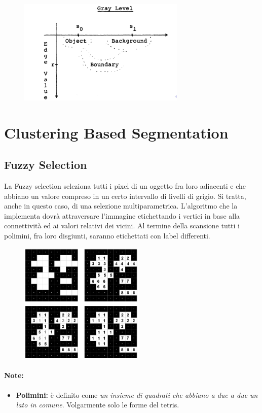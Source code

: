 \begin{figure}[H]
    \centering
    \includegraphics[width=8cm, keepaspectratio]{capitoli/immagini/imgs/edgepanda.png}
\end{figure}

\section{Clustering Based Segmentation}
\subsection{Fuzzy Selection}

La Fuzzy selection seleziona tutti i pixel di un oggetto fra loro adiacenti e che abbiano un valore compreso in un certo intervallo di livelli di grigio.
Si tratta, anche in questo caso, di una selezione multiparametrica. L'algoritmo che la implementa dovrà attraversare l'immagine etichettando i vertici in base alla connettività ed ai valori relativi dei vicini.
Al termine della scansione tutti i polimini, fra loro disgiunti, saranno etichettati con label differenti.

\begin{figure}[H]
    \centering
    \includegraphics[width=6cm, keepaspectratio]{capitoli/immagini/imgs/fuzzy-selection.png}
\end{figure}

\paragraph{Note:}
\begin{itemize}
    \item \textbf{Polimini:} è definito come \textit{un insieme di quadrati che abbiano a due a due un lato in comune}. Volgarmente solo le forme del tetris.
\end{itemize}

